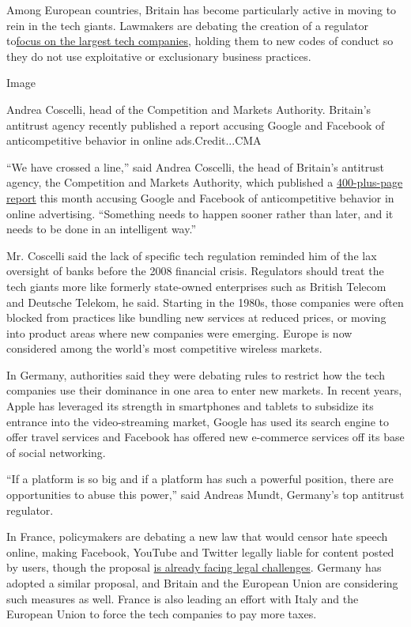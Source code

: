 Among European countries, Britain has become particularly active in
moving to rein in the tech giants. Lawmakers are debating the creation
of a regulator
to\href{https://www.gov.uk/government/news/new-regime-needed-to-take-on-tech-giants}{focus
on the largest tech companies}, holding them to new codes of conduct so
they do not use exploitative or exclusionary business practices.

Image

Andrea Coscelli, head of the Competition and Markets Authority.
Britain's antitrust agency recently published a report accusing Google
and Facebook of anticompetitive behavior in online ads.Credit...CMA

``We have crossed a line,'' said Andrea Coscelli, the head of Britain's
antitrust agency, the Competition and Markets Authority, which published
a
\href{https://www.gov.uk/cma-cases/online-platforms-and-digital-advertising-market-study}{400-plus-page
report} this month accusing Google and Facebook of anticompetitive
behavior in online advertising. ``Something needs to happen sooner
rather than later, and it needs to be done in an intelligent way.''

Mr. Coscelli said the lack of specific tech regulation reminded him of
the lax oversight of banks before the 2008 financial crisis. Regulators
should treat the tech giants more like formerly state-owned enterprises
such as British Telecom and Deutsche Telekom, he said. Starting in the
1980s, those companies were often blocked from practices like bundling
new services at reduced prices, or moving into product areas where new
companies were emerging. Europe is now considered among the world's most
competitive wireless markets.

In Germany, authorities said they were debating rules to restrict how
the tech companies use their dominance in one area to enter new markets.
In recent years, Apple has leveraged its strength in smartphones and
tablets to subsidize its entrance into the video-streaming market,
Google has used its search engine to offer travel services and Facebook
has offered new e-commerce services off its base of social networking.

``If a platform is so big and if a platform has such a powerful
position, there are opportunities to abuse this power,'' said Andreas
Mundt, Germany's top antitrust regulator.

In France, policymakers are debating a new law that would censor hate
speech online, making Facebook, YouTube and Twitter legally liable for
content posted by users, though the proposal
\href{https://www.nytimes.com/2020/06/18/world/europe/france-internet-hate-speech-regulation.html}{is
already facing legal challenges}. Germany has adopted a similar
proposal, and Britain and the European Union are considering such
measures as well. France is also leading an effort with Italy and the
European Union to force the tech companies to pay more taxes.

